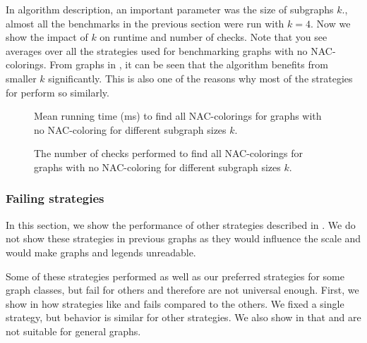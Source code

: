 In \Subgraphs{} algorithm description, an important parameter was the size of subgraphs \( k \).,
almost all the benchmarks in the previous section were run with \( k = 4 \).
Now we show the impact of	\( k \) on runtime and number of checks.
Note that you see averages over all the strategies used for benchmarking
graphs with no NAC-colorings.
From graphs in ,
it can be seen that the algorithm benefits from smaller \( k \) significantly.
This is also one of the reasons why most of
the strategies for \Subgraphs{} perform so similarly.

\begin{figure}[p]
	\centering
	\scalebox{0.5}{}
	\caption[Mean runtime for graphs with no NAC-coloring (some).]{
		Mean running time (ms) to find all NAC-colorings for graphs with no NAC-coloring for different subgraph sizes \( k \).}%
	\label{fig:graph_no_nac_coloring_first_runtime_subgraph_size}
\end{figure}
\begin{figure}[p]
	\centering
	\scalebox{0.5}{}
	\caption[Checks performed for graphs with no NAC-coloring (some).]{
		The number of checks performed to find all NAC-colorings for graphs with no NAC-coloring for different subgraph sizes \( k \).}%
	\label{fig:graph_no_nac_coloring_first_checks_subgraph_size}
\end{figure}



\subsubsection{Failing strategies}%
\label{sec:failing_strategies}

In this section, we show the performance of other strategies described in .
We do not show these strategies in previous graphs as they would influence
the scale and would make graphs and legends unreadable.

Some of these strategies performed as well as our preferred strategies for some graph classes,
but fail for others and therefore are not universal enough.
First, we show in 
how strategies like \Log{} and \PromisingCycles{} fails compared to the others.
We fixed a single strategy, but behavior is similar for other strategies.
We also show in 
that \KernighanLin{} and \Cuts{} are not suitable for general graphs.

